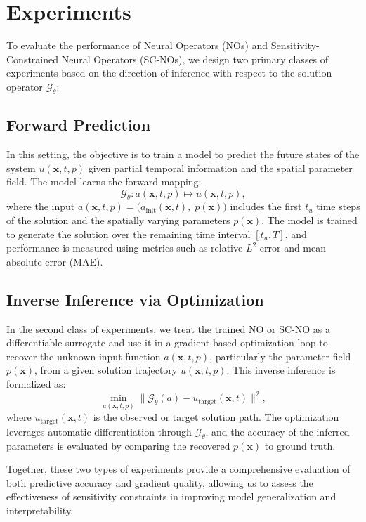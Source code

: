 \section{Experiments}
\label{sec:EXP}

\renewcommand{\thefigure}{G.\arabic{figure}}  %
\renewcommand{\thetable}{G.\arabic{table}}  %

To evaluate the performance of Neural Operators (NOs) and Sensitivity-Constrained Neural Operators (SC-NOs), we design two primary classes of experiments based on the direction of inference with respect to the solution operator \( \mathcal{G}_\theta \):


\subsection*{Forward Prediction}

In this setting, the objective is to train a model to predict the future states of the system \( u(\mathbf{x}, t, p) \) given partial temporal information and the spatial parameter field. The model learns the forward mapping:
\begin{equation}
\mathcal{G}_\theta: a(\mathbf{x}, t, p) \mapsto u(\mathbf{x}, t, p),
\end{equation}
where the input \( a(\mathbf{x}, t, p) = \big(a_{\text{init}}(\mathbf{x}, t),\; p(\mathbf{x})\big) \) includes the first \( t_u \) time steps of the solution and the spatially varying parameters \( p(\mathbf{x}) \). The model is trained to generate the solution over the remaining time interval \( [t_u, T] \), and performance is measured using metrics such as relative \( L^2 \) error and mean absolute error (MAE).

\subsection*{Inverse Inference via Optimization}

In the second class of experiments, we treat the trained NO or SC-NO as a differentiable surrogate and use it in a gradient-based optimization loop to recover the unknown input function \( a(\mathbf{x}, t, p) \), particularly the parameter field \( p(\mathbf{x}) \), from a given solution trajectory \( u(\mathbf{x}, t, p) \). This inverse inference is formalized as:
\begin{equation}
\min_{a(\mathbf{x}, t, p)} \| \mathcal{G}_\theta(a) - u_{\text{target}}(\mathbf{x}, t) \|^2,
\end{equation}
where \( u_{\text{target}}(\mathbf{x}, t) \) is the observed or target solution path. The optimization leverages automatic differentiation through \( \mathcal{G}_\theta \), and the accuracy of the inferred parameters is evaluated by comparing the recovered \( p(\mathbf{x}) \) to ground truth.

\vspace{6pt}
Together, these two types of experiments provide a comprehensive evaluation of both predictive accuracy and gradient quality, allowing us to assess the effectiveness of sensitivity constraints in improving model generalization and interpretability.
